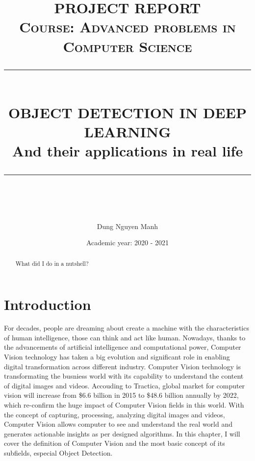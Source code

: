 \documentclass[12pt]{report}
\newcommand{\HRule}[1]{\rule{\linewidth}{#1}}
\begin{document}
\title{ \normalsize \textsc{PROJECT REPORT\\
    Course: Advanced problems in Computer Science}
\\ [5.0cm]
\HRule{0.5pt} \\
\LARGE \textbf{\uppercase{OBJECT DETECTION IN DEEP LEARNING}}
\\ [0.25 cm]
\large {And their applications in real life}
\HRule{2pt} \\ [0.5 cm]
\normalsize  \vspace*{5\baselineskip}}

\date{
    \large{Academic year: 2020 - 2021}
}

\author{
    Dung Nguyen Manh \\
}

\newpage
\maketitle

\sectionfont{\scshape}

\tableofcontents
\newpage


\begin{abstract}
    What did I do in a nutshell?
\end{abstract}


\chapter{Introduction}
For decades, people are dreaming about create a machine with the characteristics
of human intelligence, those can think and act like human. Nowadays, thanks to the
advancements of artificial intelligence and computational power, Computer Vision
technology has taken a big evolution and significant role in enabling digital
transformation across different industry. Computer Vision technology is
transformating the busniess world with its capability to understand the content
of digital images and videos. Accouding to Tractica\cite{tracitareport}, global
market for computer vision will increase from \$6.6 billion in 2015 to \$48.6
billion annually by 2022, which re-confirm the huge impact of Computer Vision fields
in this world. With the concept of capturing, processing, analyzing digital images
and videos, Computer Vision allows computer to see and understand the real world and
generates actionable insights as per designed algorithms. In this chapter, I will cover
the definition of Computer Vision and the most basic concept of its subfields,
especial Object Detection.
\end{document}
